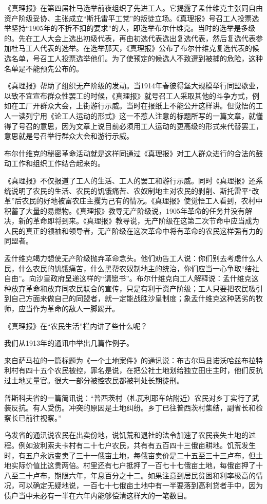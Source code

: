 《真理报》在第四届杜马选举前夜组织了先进工人。它揭露了孟什维克主张同自由资产阶级妥协、主张成立“斯托雷平工党”的叛徒立场。《真理报》号召工人投票选举坚持“1905年的不折不扣的要求”的人，即选举布尔什维克。当时的选举是多级的。先在工人大会上选出初级代表，再由初选代表选出复选代表，然后复选代表参加杜马工人代表的选举。在选举那天，《真理报》公布了布尔什维克复选代表的候选名单，号召工人投票选举他们。为了使预定的候选人不致遭到被捕的危险，这种名单是不能预先公布的。

《真理报》帮助了组织无产阶级的发动。当1914年春彼得堡大规模举行同盟歇业，以致不宜宣布群众性罢工的时候，《真理报》就号召工人采取其他的斗争方式，例如在工厂开群众大会，上街游行示威。当时在报纸上不能公开这样讲。但觉悟的工人一读列宁用《论工人运动的形式》这一不惹人注意的标题所写的一篇文章，就懂得了号召的意思，因为文章上说目前必须用工人运动的更高级的形式来代替罢工，意思就是号召举行群众大会和游行示威。

布尔什维克的秘密革命活动就是这样同通过《真理报》对工人群众进行的合法的鼓动工作和组织工作结合起来的。

《真理报》不仅报道了工人的生活、工人的罢工和游行示威。同时《真理报》还系统说明了农民的生活、农民的饥饿痛苦、农奴制地主对农民的剥削、斯托雷平“改革”后农民的好地被富农庄主攫为己有的情况。《真理报》使觉悟工人看到，农村中积蓄了大量的易燃物。《真理报》教导无产阶级说，1905年革命的任务并没有解决，新的革命即将到来。《真理报》教导说，无产阶级在这第二次节命中应当成为人民的真正的领袖和领导者，无产阶级在这次革命中将有革命的农民这样强有力的同盟者。

孟什维克竭力想使无产阶级抛弃革命念头。他们劝告工人说：你们别去考虑什么人民，什么农民的饥饿痛苦，什么黑帮农奴制地主的统治，你们应当一心争取“结社自由”。向沙皇政府呈递这样的“请愿书”。布尔什维克向工人解释说：孟什维克这种放弃革命和放弃同农民联合的宣传，只是有利于资产阶级；工人只要把农民吸引到自己方面来做自己的同盟者，就一定能战胜沙皇制度；象孟什维克这种恶劣的牧师，应当作为革命的敌人一脚踢开。

《真理报》在“农民生活”栏内讲了些什么呢？

我们从1913年的通讯中举出几篇作例子。

来自萨马拉的一篇标题为《一个土地案件》的通讯说：布古尔玛县诺沃哈兹布拉特利村有四十五个农民被控，罪名是说，在把公社土地划给独立田庄主时，他们反抗过土地丈量官。很大一部分被控农民都被判处长期徒刑。

普斯科夫省的一篇简讯说：“普西茨村（札瓦利耶车站附近）农民对乡丁实行了武装反抗。有人受伤。冲突的原因是土地纠纷。乡丁已往普西茨村集结，副省长和检察长已前往视察。”

乌发省的通汛说农民在出卖份地，说饥荒和退社的法令加速了农民丧失土地的过程。例如波利索夫卡村有二十七户农民，共有有五百四十三俄亩耕地。饥荒发生时，有五户永远变卖了三十一俄亩土地，每俄亩卖价是二十五至三十三卢布，但土地实际价值比这贵两倍。村里还有七户抵押了一百七十七俄亩土地，每俄亩押了十八至二十卢布，期限六年，年息百分之十二。如果注意到居民贫困和利率极高的情况，可以确定无疑地说，一百七十七俄亩土地中有一半要落到高利贷者手中，因为债户当中未必有一半在六年内能够偿清这样大的一笔数目。

